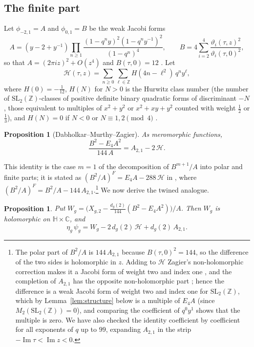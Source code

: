 \documentclass[11pt]{amsart}
\newtheorem{proposition}[theorem]{Proposition}
\theoremstyle{definition}
\newcommand{\ZZ}{\mathbb{Z}}
\newcommand{\CC}{\mathbb{C}}
\newcommand{\HH}{\mathbb{H}}
\newcommand{\vt}{\vartheta}
\newcommand{\cH}{\mathcal H}
\begin{document}
\subsection{The finite part}
Let $\phi_{-2,1}=A$ and $\phi_{0,1}=B$ be the weak Jacobi forms
\[
A=(y-2+y^{-1})\prod_{n\ge1}\frac{(1-q^ny)^2(1-q^ny^{-1})^2}{(1-q^n)^4},\qquad
B=4\sum_{i=2}^4\frac{\vt_i(\tau,z)^2}{\vt_i(\tau,0)^2},
\]
so that $A=(2\pi iz)^2+O(z^4)$ and $B(\tau,0)=12$ \cite[Section~9]{EZ85}. Let
\[
\cH(\tau,z)=\sum_{n\ge0}\sum_{\ell\in\ZZ}H(4n-\ell^2)\,q^ny^\ell,
\]
where $H(0)=-\tfrac1{12}$, $H(N)$ for $N>0$ is the Hurwitz class number (the number of $\mathrm{SL}_2(\ZZ)$-classes of positive definite binary quadratic forms of discriminant $-N$, those equivalent to multiples of $x^2+y^2$ or $x^2+xy+y^2$ counted with weight $\frac12$ or $\frac13$), and $H(N)=0$ if $N<0$ or $N\equiv1,2\pmod4$ \cite{HZ76,Zag08}.

\begin{proposition}[Dabholkar--Murthy--Zagier]\label{prop:DMZ}
As meromorphic functions,
\[
\frac{B^2-E_4A^2}{144\,A}=A_{2,1}-2\,\cH .
\]
\end{proposition}

This identity is the case $m=1$ of the decomposition of $B^{m+1}/A$ into polar and finite parts; it is stated as $(B^2/A)^F=E_4A-288\,\cH$ in \cite[Section~3]{BM13}, where $(B^2/A)^F=B^2/A-144\,A_{2,1}$.\footnote{The polar part of $B^2/A$ is $144\,A_{2,1}$ because $B(\tau,0)^2=144$, so the difference of the two sides is holomorphic in $z$. Adding to $\cH$ Zagier's non-holomorphic correction makes it a Jacobi form of weight two and index one \cite{HZ76,Zag08}, and the completion of $A_{2,1}$ has the opposite non-holomorphic part \cite[Section~3]{BM13}; hence the difference is a weak Jacobi form of weight two and index one for $\mathrm{SL}_2(\ZZ)$, which by Lemma~\ref{lem:structure} below is a multiple of $E_4A$ (since $M_2(\mathrm{SL}_2(\ZZ))=0$), and comparing the coefficient of $q^0y^1$ shows that the multiple is zero. We have also checked the identity coefficient by coefficient for all exponents of $q$ up to $99$, expanding $A_{2,1}$ in the strip $-\operatorname{Im}\tau<\operatorname{Im}z<0$.} We now derive the twined analogue.

\begin{proposition}\label{prop:W}
Put $W_g=\bigl(X_{g,2}-\tfrac{d_g(2)}{144}(B^2-E_4A^2)\bigr)/A$. Then $W_g$ is holomorphic on $\HH\times\CC$, and
\begin{equation}\label{eq:split}
\eta_g\,\psi_g=W_g-2\,d_g(2)\,\cH+d_g(2)\,A_{2,1}.
\end{equation}
\end{proposition}
\end{document}
